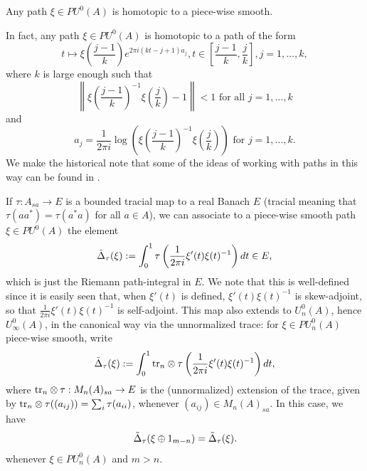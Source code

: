 \documentclass{amsart}
\begin{document}
\begin{lemma}\label{lem:any path homotopic to piecewise smooth}
Any path $\xi \in PU^0(A)$ is homotopic to a piece-wise smooth.
\end{lemma}
In fact, any path $\xi \in PU^0(A)$ is homotopic to a path of the form
\begin{equation}
t \mapsto \xi\left(\frac{j-1}{k}\right)e^{2\pi i(kt -j + 1)a_j}, t \in \left[\frac{j-1}{k},\frac{j}{k}\right], j=1,\dots,k,
\end{equation}
where $k$ is large enough such that
\begin{equation}
\left\| \xi\left(\frac{j-1}{k}\right)^{-1}\xi\left(\frac{j}{k}\right) - 1\right\| < 1 \text{ for all } j=1,\dots,k
\end{equation}
and
\begin{equation}
a_j = \frac{1}{2\pi i}\log \left(\xi\left(\frac{j-1}{k}\right)^{-1}\xi\left(\frac{j}{k}\right)\right) \text{ for } j=1,\dots,k.
\end{equation}
We make the historical note that some of the ideas of working with paths in this way can be found in \cite{ArakiSmithSmith71}.


If $\tau: A_{sa} \to E$ is a bounded tracial map to a real Banach $E$ (tracial meaning that $\tau(aa^*) = \tau(a^*a)$ for all $a \in A$), we can associate to a piece-wise smooth path $\xi \in PU^0(A)$ the element
\begin{equation}
\tilde{\Delta}_\tau(\xi) := \int_0^1\tau\left(\frac{1}{2\pi i}\xi'(t)\xi(t)^{-1}\right)dt \in E,
\end{equation}
which is just the Riemann path-integral in $E$.
We note that this is well-defined since it is easily seen that, when $\xi'(t)$ is defined, $\xi'(t)\xi(t)^{-1}$ is skew-adjoint, so that $\frac{1}{2\pi i}\xi'(t)\xi(t)^{-1}$ is self-adjoint.
This map also extends to $U_n^0(A)$, hence $U_{\infty}^0(A)$, in the canonical way via the unnormalized trace: for $\xi \in PU_n^0(A)$ piece-wise smooth, write
\begin{equation}
\tilde{\Delta}_\tau(\xi) := \int_0^1 \text{tr}_n \otimes \tau \left(\frac{1}{2\pi i}\xi'(t)\xi(t)^{-1}\right)dt,
\end{equation}
where $\text{tr}_n \otimes \tau: M_n(A)_{sa} \to E$ is the (unnormalized) extension of the trace, given by $\text{tr}_n\otimes \tau((a_{ij})) = \sum_i \tau(a_{ii})$, whenever $(a_{ij}) \in M_n(A)_{sa}$.
In this case, we have
\begin{equation}
\tilde{\Delta}_\tau(\xi \oplus 1_{m-n}) = \tilde{\Delta}_\tau(\xi).
\end{equation}
whenever $\xi \in PU_n^0(A)$ and $m > n$.
\end{document}
